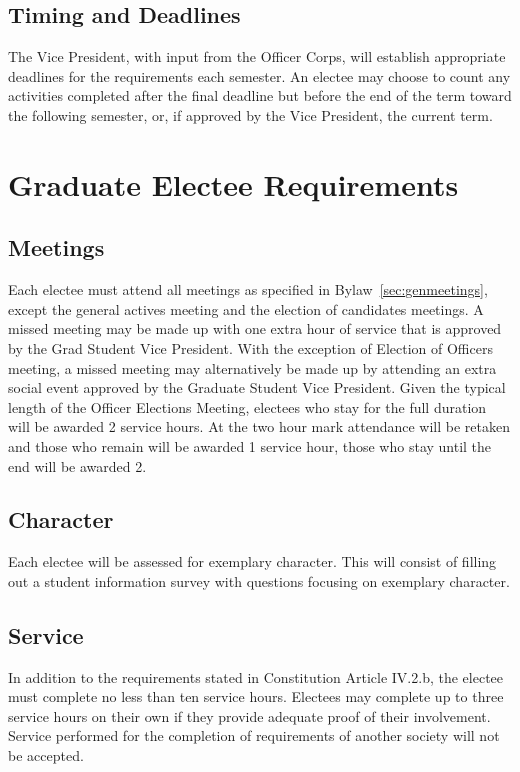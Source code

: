\section{Timing and Deadlines}  The Vice President, with input from the Officer Corps, will establish appropriate deadlines for the requirements each semester. An electee may choose to count any activities completed after the final deadline but before the end of the term toward the following semester, or, if approved by the Vice President, the current term.

\chapter{Graduate Electee Requirements}\label{sec:gradreqs}%
\section{Meetings} Each electee must attend all meetings as specified in Bylaw~\ref{sec:genmeetings}, except the general actives meeting and the election of candidates  meetings. A missed meeting may be made up with one extra hour of service that is approved by the Grad Student Vice President. 
With the exception of Election of Officers meeting, a missed meeting may alternatively be made up by attending an extra social event approved by the Graduate Student Vice President. Given the typical length of the Officer Elections Meeting, electees who stay for the full duration will be awarded 2 service hours. At the two hour mark attendance will be retaken and those who remain will be awarded 1 service hour, those who stay until the end will be awarded 2.
\section{Character} Each electee will be assessed for exemplary character. This
will consist of filling out a student information survey with questions focusing on exemplary character.
\section{Service}	In addition to the requirements stated in Constitution Article IV.2.b, the electee must complete no less than ten service hours.  Electees may complete up to three service hours on their own if they provide adequate proof of their involvement. Service performed for the completion of requirements of another society will not be accepted. %
